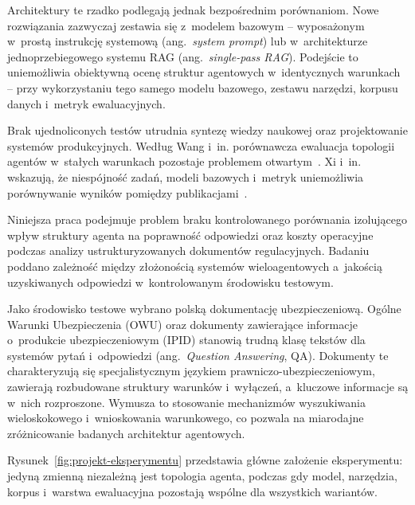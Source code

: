 Architektury te rzadko podlegają jednak bezpośrednim porównaniom. Nowe
rozwiązania zazwyczaj zestawia się z~modelem bazowym -- wyposażonym w~prostą
instrukcję systemową (ang.~\textit{system prompt}) lub w~architekturze
jednoprzebiegowego systemu RAG (ang.~\textit{single-pass RAG}). Podejście to
uniemożliwia obiektywną ocenę struktur agentowych w~identycznych warunkach --
przy wykorzystaniu tego samego modelu bazowego, zestawu narzędzi, korpusu
danych i~metryk ewaluacyjnych.

Brak ujednoliconych testów utrudnia syntezę wiedzy naukowej oraz projektowanie
systemów produkcyjnych. Według Wang i~in. porównawcza ewaluacja topologii
agentów w~stałych warunkach pozostaje problemem otwartym~\cite{wang2024survey}.
Xi i~in. wskazują, że niespójność zadań, modeli bazowych i~metryk uniemożliwia
porównywanie wyników pomiędzy publikacjami~\cite{xi2025rise}.

Niniejsza praca podejmuje problem braku kontrolowanego porównania izolującego
wpływ struktury agenta na poprawność odpowiedzi oraz koszty operacyjne podczas
analizy ustrukturyzowanych dokumentów regulacyjnych. Badaniu poddano zależność
między złożonością systemów wieloagentowych a~jakością uzyskiwanych odpowiedzi
w~kontrolowanym środowisku testowym.

Jako środowisko testowe wybrano polską dokumentację ubezpieczeniową. Ogólne
Warunki Ubezpieczenia (OWU) oraz dokumenty zawierające informacje o~produkcie
ubezpieczeniowym (IPID) stanowią trudną klasę tekstów dla systemów pytań
i~odpowiedzi (ang.~\textit{Question Answering}, QA). Dokumenty te
charakteryzują się specjalistycznym językiem prawniczo-ubezpieczeniowym,
zawierają rozbudowane struktury warunków i~wyłączeń, a~kluczowe informacje są
w~nich rozproszone. Wymusza to stosowanie mechanizmów wyszukiwania
wieloskokowego i~wnioskowania warunkowego, co pozwala na miarodajne
zróżnicowanie badanych architektur agentowych.

Rysunek~\ref{fig:projekt-eksperymentu} przedstawia główne założenie
eksperymentu: jedyną zmienną niezależną jest topologia agenta, podczas gdy
model, narzędzia, korpus i~warstwa ewaluacyjna pozostają wspólne dla wszystkich
wariantów.

